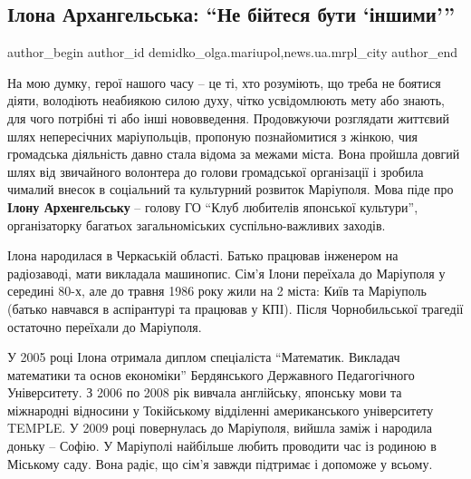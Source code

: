  
 
 
 
 
 
\subsection{Ілона Архангельська: \enquote{Не бійтеся бути \enquote{іншими}}}
\label{sec:19_06_2019.stz.news.ua.mrpl_city.1.ilona_arhangelska_ne_bijtes_buty_inshymy}
 
\ifcmt
 author_begin
   author_id demidko_olga.mariupol,news.ua.mrpl_city
 author_end
\fi


На мою думку, герої нашого часу – це ті, хто розуміють, що треба не боятися
діяти, володіють неабиякою силою духу, чітко усвідомлюють мету або знають, для
чого потрібні ті або інші нововведення. Продовжуючи розглядати життєвий шлях
непересічних маріупольців, пропоную познайомитися з жінкою, чия громадська
діяльність давно стала відома за межами міста. Вона пройшла довгий шлях від
звичайного волонтера до голови громадської організації і зробила чималий внесок
в соціальний та культурний розвиток Маріуполя. Мова піде про \textbf{Ілону
Архенгельську} – голову ГО \enquote{Клуб любителів японської культури},
організаторку багатьох загальноміських суспільно-важливих заходів.

Ілона народилася в Черкаській області. Батько працював інженером на
радіозаводі, мати викладала машинопис. Сім'я Ілони переїхала до Маріуполя у
середині 80-х, але до травня 1986 року жили на 2 міста: Київ та Маріуполь
(батько навчався в аспірантурі та працював у КПІ). Після Чорнобильської
трагедії остаточно переїхали до Маріуполя.

У 2005 році Ілона отримала диплом спеціаліста \enquote{Математик. Викладач математики
та основ економіки} Бердянського Державного Педагогічного Університету. З 2006
по 2008 рік вивчала англійську, японську мови та міжнародні відносини у
Токійському відділенні американського університету TEMPLE. У 2009 році
повернулась до Маріуполя, вийшла заміж і народила доньку – Софію. У Маріуполі
найбільше любить проводити час із родиною в Міському саду. Вона радіє, що сім'я
завжди підтримає і допоможе у всьому.

